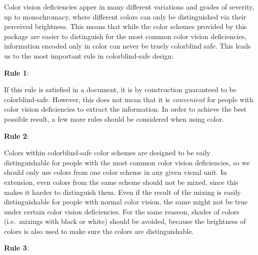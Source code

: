 \documentclass{scrartcl}
\begin{document}
Color vision deficiencies apper in many different variations and grades of severity, up to monochromacy, where different colors can only be distinguished via their perceived brightness.
This means that while the color schemes provided by this package are easier to distinguish for the most common color vision deficiencies, information encoded only in color can never be truely colorblind safe.
This leads us to the most important rule in colorblind-safe design:
\begin{center}
    \setlength{\fboxrule}{1pt}
    \textbf{Rule 1}:
\end{center}

If this rule is satisfied in a document, it is by construction guaranteed to be colorblind-safe.
However, this does not mean that it is \emph{convenient} for people with color vision deficiencies to extract the information.
In order to achieve the best possible result, a few more rules should be considered when using color.
\begin{center}
    \setlength{\fboxrule}{1pt}
    \textbf{Rule 2}:
\end{center}

Colors within colorblind-safe color schemes are designed to be eaily distinguishable for people with the most common color vision deficiencies, so we should only use colors from one color scheme in any given visual unit.
In extension, even colors from the same scheme should not be mixed, since this makes it harder to distinguish them.
Even if the result of the mixing is easily distinguishable for people with normal color vision, the same might not be true under certain color vision deficiencies.
For the same reaseon, shades of colors (i.e.\ mixings with black or white) should be avoided, because the brightness of colors is also used to make sure the colors are distinguishable.

\begin{center}
    \setlength{\fboxrule}{1pt}
    \textbf{Rule 3}:
\end{center}
\end{document}
